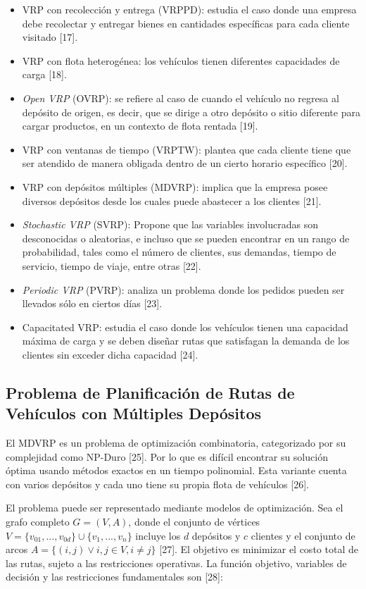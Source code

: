 \begin{itemize}
  \item VRP con recolecci\'on y entrega (VRPPD): estudia el caso donde una empresa debe recolectar y entregar bienes en cantidades espec\'ificas para cada cliente visitado [17].
  \item VRP con flota heterog\'enea: los veh\'iculos tienen diferentes capacidades de carga [18].
  \item \textit{Open VRP} (OVRP): se refiere al caso de cuando el veh\'iculo no regresa al dep\'osito de origen, es decir, que se dirige a otro dep\'osito o sitio diferente para cargar productos, en un contexto de flota rentada [19].
  \item VRP con ventanas de tiempo (VRPTW): plantea que cada cliente tiene que ser atendido de manera obligada dentro de un cierto horario espec\'ifico [20].
  \item VRP con dep\'ositos m\'ultiples (MDVRP): implica que la empresa posee diversos dep\'ositos desde los cuales puede abastecer a los clientes [21].
  \item \textit{Stochastic VRP} (SVRP): Propone que las variables involucradas son desconocidas o aleatorias, e incluso que se pueden encontrar en un rango de probabilidad, tales como el n\'umero de clientes, sus demandas, tiempo de servicio, tiempo de viaje, entre otras [22].
  \item \textit{Periodic VRP} (PVRP): analiza un problema donde los pedidos pueden ser llevados s\'olo en ciertos d\'ias [23].
  \item Capacitated VRP: estudia el caso donde los veh\'iculos tienen una capacidad m\'axima de carga y se deben dise\~nar rutas que satisfagan la demanda de los clientes sin exceder dicha capacidad [24].
\end{itemize}

\subsection{Problema de Planificaci\'on de Rutas de Veh\'iculos con M\'ultiples Dep\'ositos}

El MDVRP es un problema de optimizaci\'on combinatoria, categorizado por su complejidad como NP-Duro [25]. Por lo que es dif\'icil encontrar su soluci\'on \'optima usando m\'etodos exactos en un tiempo polinomial. Esta variante cuenta con varios dep\'ositos y cada uno tiene su propia flota de veh\'iculos [26].

El problema puede ser representado mediante modelos de optimizaci\'on. Sea el grafo completo $G = (V,A)$, donde el conjunto de v\'ertices $V = \{v_{01},...,v_{0d}\} \cup \{v_{1},...,v_{n}\}$ incluye los $d$ dep\'ositos y $c$ clientes y el conjunto de arcos $A = \{(i,j) \vee i,j \in V, i \neq j\}$ [27]. El objetivo es minimizar el costo total de las rutas, sujeto a las restricciones operativas. La funci\'on objetivo, variables de decisi\'on y las restricciones fundamentales son [28]:

